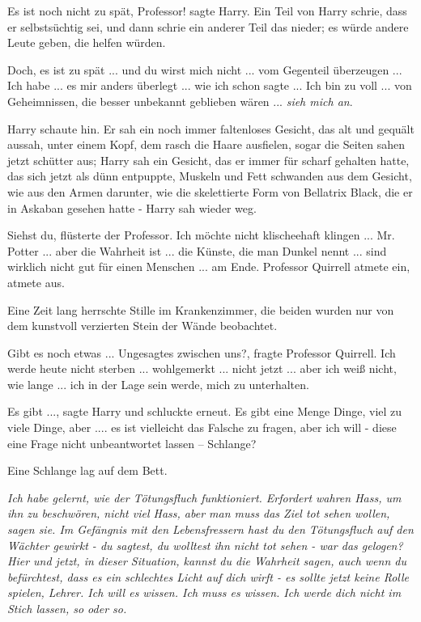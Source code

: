 \glqq{}Es ist noch nicht zu spät, Professor!\grqq{} sagte Harry. Ein Teil von
Harry schrie, dass er selbstsüchtig sei, und dann schrie ein anderer Teil das
nieder; es würde andere Leute geben, die helfen würden.

\glqq{}Doch, es ist zu spät ... und du wirst mich nicht ... vom Gegenteil
überzeugen ... Ich habe ... es mir anders überlegt ... wie ich schon sagte ... Ich
bin zu voll ... von Geheimnissen, die besser unbekannt geblieben wären ...
\emph{sieh mich an}.\grqq{}

Harry schaute hin. Er sah ein noch immer faltenloses Gesicht, das alt und
gequält aussah, unter einem Kopf, dem rasch die Haare ausfielen, sogar die
Seiten sahen jetzt schütter aus; Harry sah ein Gesicht, das er immer für scharf
gehalten hatte, das sich jetzt als dünn entpuppte, Muskeln und Fett schwanden
aus dem Gesicht, wie aus den Armen darunter, wie die skelettierte Form von
Bellatrix Black, die er in Askaban gesehen hatte - Harry sah wieder weg.

\glqq{}Siehst du\grqq{}, flüsterte der Professor. \glqq{}Ich möchte nicht
klischeehaft klingen ... Mr. Potter ... aber die Wahrheit ist ... die Künste, die
man Dunkel nennt ... sind wirklich nicht gut für einen Menschen ... am
Ende.\grqq{} Professor Quirrell atmete ein, atmete aus.

Eine Zeit lang herrschte Stille im Krankenzimmer, die beiden wurden nur von dem
kunstvoll verzierten Stein der Wände beobachtet.

\glqq{}Gibt es noch etwas ... Ungesagtes zwischen uns?\grqq{}, fragte Professor
Quirrell. \glqq{}Ich werde heute nicht sterben ... wohlgemerkt ... nicht jetzt ...
aber ich weiß nicht, wie lange ... ich in der Lage sein werde, mich zu
unterhalten.\grqq{}

\glqq{}Es gibt ...\grqq{}, sagte Harry und schluckte erneut. \glqq{}Es gibt eine
Menge Dinge, viel zu viele Dinge, aber .... es ist vielleicht das Falsche zu
fragen, aber ich will - diese eine Frage nicht unbeantwortet lassen – Schlange?\grqq{}

Eine Schlange lag auf dem Bett.

\glqq{}\emph{Ich habe gelernt, wie der Tötungsfluch funktioniert. Erfordert
wahren Hass, um ihn zu beschwören, nicht viel Hass, aber man muss das Ziel tot
sehen wollen, sagen sie. Im Gefängnis mit den Lebensfressern hast du den
Tötungsfluch auf den Wächter gewirkt - du sagtest, du wolltest ihn nicht tot
sehen - war das gelogen? Hier und jetzt, in dieser Situation, kannst du die
Wahrheit sagen, auch wenn du befürchtest, dass es ein schlechtes Licht auf dich
wirft - es sollte jetzt keine Rolle spielen, Lehrer. Ich will es wissen. Ich
muss es wissen. Ich werde dich nicht im Stich lassen, so oder so.}\grqq{}

